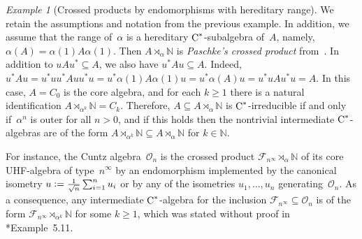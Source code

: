 \documentclass[a4paper]{amsart}
\theoremstyle{plain}
\theoremstyle{definition}
\theoremstyle{remark}
\newtheorem{example}[theorem]{Example}
\numberwithin{theorem}{section}
\numberwithin{equation}{section}
\newcommand*{\nb}{\nobreakdash}
\newcommand*{\N}{\mathbb N}
\newcommand*{\Cst}{\textup C^*}%
\newcommand*{\defeq}{\mathrel{\vcentcolon=}}%
\begin{document}
\begin{example}[Crossed products by endomorphisms with hereditary
  range]
  \label{ex:endomorphism_crossed_product2}
  We retain the assumptions and notation from the previous example.
  In addition, we assume that the range of~\(\alpha\) is a hereditary
  \(\Cst\)\nb-subalgebra of~\(A\), namely,
  \(\alpha(A)=\alpha(1)A\alpha(1)\).
  Then \(A\rtimes_\alpha\N\) is \emph{Paschke's crossed product}
  from~\cite{Paschke:Crossed_endomorphism}.
  In addition to \(u A u^*\subseteq A\), we also have \(u^* A
  u\subseteq A\).
  Indeed,  \(u^* A u = u^* u u^* A u u^* u = u^* \alpha(1) A \alpha(1)
  u = u^* \alpha(A) u = u^* u A u^* u = A\).
  In this case, \(A=C_0\) is the core algebra, and for each \(k\ge 1\)
  there is a natural identification \(A\rtimes_{\alpha^k}\N=C_k\).
  Therefore, \(A\subseteq A\rtimes_\alpha\N\) is
  \(\Cst\)\nb-irreducible if and only if~\(\alpha^n\) is outer for all
  \(n>0\), and if this holds then the nontrivial intermediate
  \(\Cst\)\nb-algebras are of the form
  \(A\rtimes_{\alpha^k}\N\subseteq A\rtimes_\alpha\N\) for \(k\in
  \N\).

  For instance, the Cuntz algebra~\(\mathcal{O}_n\) is the crossed
  product \(\mathcal{F}_{n^\infty}\rtimes_\alpha\N\) of its core
  UHF-algebra of type~\(n^\infty\) by an endomorphism implemented by
  the canonical isometry \(u\defeq \frac{1}{\sqrt{n}}\sum_{i=1}^n
  u_i\) or by any of the isometries \(u_1,\dotsc,u_n\)
  generating~\(\mathcal{O}_n\).
  As a consequence, any intermediate \(\Cst\)\nb-algebra for the
  inclusion \(\mathcal{F}_{n^\infty}\subseteq \mathcal{O}_n\) is of
  the form \(\mathcal{F}_{n^\infty}\rtimes_{\alpha^k}\N\) for some
  \(k\ge 1\), which was stated without proof in
  \cite{Rordam:Irreducible_inclusions}*{Example~5.11}.
\end{example}
\end{document}
